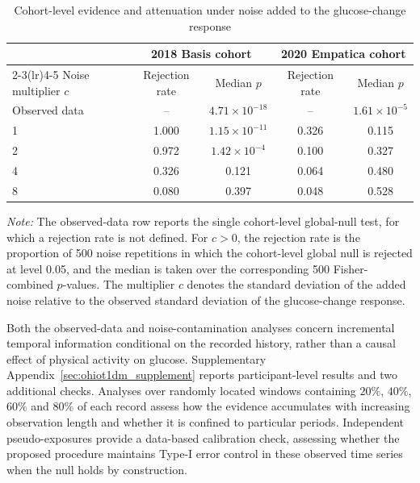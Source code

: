\documentclass[12pt]{article}
\numberwithin{equation}{section}
\begin{document}
\begin{table}[htbp]
\centering
\caption{Cohort-level evidence and attenuation under noise added to the glucose-change response}
\label{tab:ohiot1dm_noise}
\begin{threeparttable}
\begin{tabular}{lcccc}
\toprule
& \multicolumn{2}{c}{2018 Basis cohort}
& \multicolumn{2}{c}{2020 Empatica cohort} \\
\cmidrule(lr){2-3}\cmidrule(lr){4-5}
Noise multiplier \(c\)
& Rejection rate & Median \(p\)
& Rejection rate & Median \(p\) \\
\midrule
Observed data
    & --    & \(4.71\times10^{-18}\)
    & --    & \(1.61\times10^{-5}\) \\
1
    & 1.000 & \(1.15\times10^{-11}\)
    & 0.326 & 0.115 \\
2
    & 0.972 & \(1.42\times10^{-4}\)
    & 0.100 & 0.327 \\
4
    & 0.326 & 0.121
    & 0.064 & 0.480 \\
8
    & 0.080 & 0.397
    & 0.048 & 0.528 \\
\bottomrule
\end{tabular}

\begin{tablenotes}[flushleft]
\footnotesize
\item \textit{Note:}
The observed-data row reports the single cohort-level global-null test, for
which a rejection rate is not defined. For \(c>0\), the rejection rate is
the proportion of 500 noise repetitions in which the cohort-level global null
is rejected at level 0.05, and the median is taken over the corresponding
500 Fisher-combined \(p\)-values. The multiplier \(c\) denotes the standard
deviation of the added noise relative to the observed standard deviation of
the glucose-change response.
\end{tablenotes}
\end{threeparttable}
\end{table}


Both the observed-data and noise-contamination analyses concern incremental temporal information conditional on the recorded history, rather than a causal effect of physical activity on glucose. Supplementary Appendix~\ref{sec:ohiot1dm_supplement} reports participant-level results and two additional checks. Analyses over randomly located windows containing \(20\%\), \(40\%\), \(60\%\) and \(80\%\) of each record assess how the evidence accumulates with increasing observation length and whether it is confined to particular periods. Independent pseudo-exposures provide a data-based calibration check, assessing whether the proposed procedure maintains Type-I error control in these observed time series when the null holds by construction.
\end{document}

